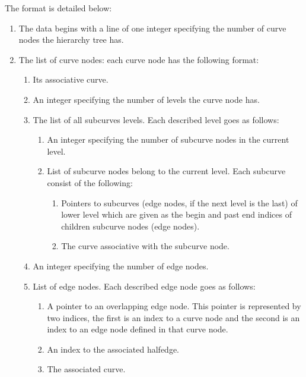 \begin{ccAdvanced}
The format is detailed below:

\begin{enumerate}
    \item The data begins with a line of one integer specifying the number 
    of curve nodes the hierarchy tree has.
    \item The list of curve nodes: 
    each curve node has the following format:
    \begin{enumerate}
        \item Its associative curve.
        \item An integer specifying the number of levels the curve node has.
        \item The list of all subcurves levels. Each described level goes as 
              follows:
        \begin{enumerate}
            \item An integer specifying the number of subcurve nodes in the 
                  current level.
            \item List of subcurve nodes belong to the current level. 
            Each subcurve consist of the following:
            \begin{enumerate}
                \item Pointers to subcurves (edge nodes, if the next level 
                      is the last) 
                      of lower level which are given as the begin and past 
                      end indices of children subcurve nodes (edge nodes).
                \item The curve associative with the subcurve node.
            \end{enumerate}
        \end{enumerate}
        \item An integer specifying the number of edge nodes.
        \item List of edge nodes. Each described edge node goes as follows:
        \begin{enumerate}
            \item A pointer to an overlapping edge node.
            This pointer is represented by two indices, the first is an index 
            to a curve node 
            and the second is an index to an edge node defined in that curve 
            node.
            \item An index to the associated halfedge.
            \item The associated curve.
        \end{enumerate}    
    \end{enumerate}
\end{enumerate}


\end{ccAdvanced}
